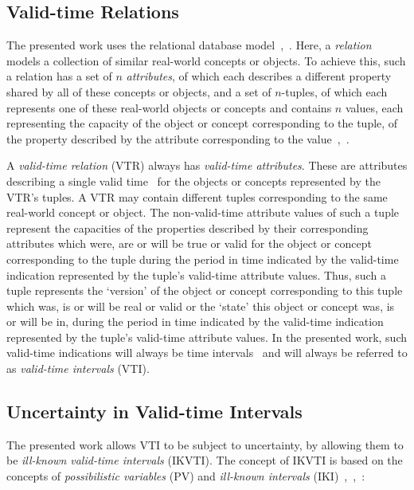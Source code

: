 \documentclass[runningheads,a4paper]{llncs}
\begin{document}
\subsection{Valid-time Relations}
The presented work uses the relational database model~\cite{Pons2012ijcis},~\cite{Galindo2001}. Here, a \emph{relation} models a collection of similar real-world concepts or objects. To achieve this, such a relation has a set of $n$ \emph{attributes}, of which each describes a different property shared by all of these concepts or objects, and a set of $n$-tuples, of which each represents one of these real-world objects or concepts and contains $n$ values, each representing the capacity of the object or concept corresponding to the tuple, of the property described by the attribute corresponding to the value~\cite{Billiet2012ipmu},~\cite{Pons2012ipmu}.

A \emph{valid-time relation} (VTR) always has \emph{valid-time attributes}. These are attributes describing a single valid time~\cite{Bohlen1998lncs} for the objects or concepts represented by the VTR's tuples. A VTR may contain different tuples corresponding to the same real-world concept or object. The non-valid-time attribute values of such a tuple represent the capacities of the properties described by their corresponding attributes which were, are or will be true or valid for the object or concept corresponding to the tuple during the period in time indicated by the valid-time indication represented by the tuple's valid-time attribute values. Thus, such a tuple represents the `version' of the object or concept corresponding to this tuple which was, is or will be real or valid or the `state' this object or concept was, is or will be in, during the period in time indicated by the valid-time indication represented by the tuple's valid-time attribute values. In the presented work, such valid-time indications will always be time intervals~\cite{Bohlen1998lncs} and will always be referred to as \emph{valid-time intervals} (VTI).

\subsection{Uncertainty in Valid-time Intervals}
The presented work allows VTI to be subject to uncertainty, by allowing them to be \emph{ill-known valid-time intervals} (IKVTI). The concept of IKVTI is based on the concepts of \emph{possibilistic variables} (PV) and \emph{ill-known intervals} (IKI)~\cite{Dubois1988cma},~\cite{Pons2013ijufkbs},~\cite{Billiet2012ipmu}:
\end{document}
